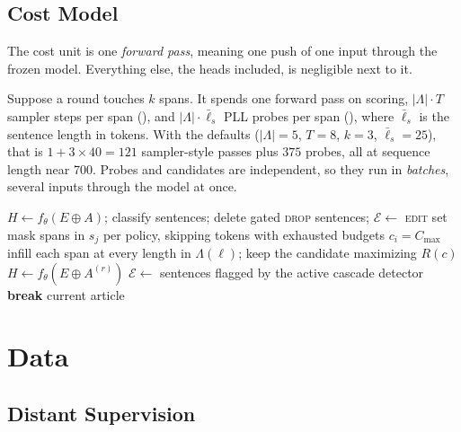 \documentclass[]{paper}
\newcommand{\edit}{\textsc{edit}}
\newcommand{\drop}{\textsc{drop}}
\begin{document}
\subsection{Cost Model}
\label{sec:cost}

The cost unit is one \emph{forward pass}, meaning one push of one input through the frozen model. Everything else, the heads included, is negligible next to it.

Suppose a round touches $k$ spans. It spends one forward pass on scoring, $|\Lambda| \cdot T$ sampler steps per span (), and $|\Lambda| \cdot \bar\ell_s$ PLL probes per span (), where $\bar\ell_s$ is the sentence length in tokens. With the defaults ($|\Lambda| = 5$, $T = 8$, $k = 3$, $\bar\ell_s = 25$), that is $1 + 3 \times 40 = 121$ sampler-style passes plus $375$ probes, all at sequence length near 700. Probes and candidates are independent, so they run in \emph{batches}, several inputs through the model at once.

\begin{algorithm}[!ht]
\caption{DiffusEdit inference. Thresholds and caps per . The length set $\Lambda$ comes from  and the candidate score $R(c)$ from .}
\label{alg:loop}
\begin{algorithmic}[1]
\State $H \gets f_\theta(E \oplus A)$; classify sentences; delete gated \drop{} sentences; $\mathcal{E} \gets$ \edit{} set
    \State mask spans in $s_j$ per policy, skipping tokens with exhausted budgets $c_i = C_{\max}$
    \State infill each span at every length in $\Lambda(\ell)$; keep the candidate maximizing $R(c)$
  \EndFor
  \State $H \gets f_\theta(E \oplus A^{(r)})$
  \State $\mathcal{E} \gets$ sentences flagged by the active cascade detector
   \textbf{break}
  \EndIf
\EndFor
\State \Return current article
\end{algorithmic}
\end{algorithm}

\section{Data}
\label{sec:data}

\subsection{Distant Supervision}
\label{sec:supervision}
\end{document}
